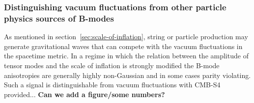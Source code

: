 
\subsubsection{Distinguishing vacuum fluctuations from other particle physics sources of B-modes}

As mentioned in section~\ref{sec:scale-of-inflation}, string or particle production may generate gravitational waves that can compete with the vacuum fluctuations in the spacetime metric. In a regime in which the relation between the amplitude of tensor modes and the scale of inflation is strongly modified the B-mode anisotropies are generally highly non-Gaussian and in some cases parity violating. Such a signal is distinguishable from vacuum fluctuations with CMB-S4 provided... {\bf Can we add a figure/some numbers?}\\

